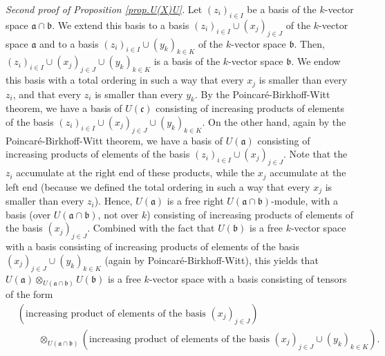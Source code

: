 \documentclass
[numbers=enddot,12pt,final,onecolumn,german,notitlepage]{scrartcl}%
\theoremstyle{definition}
\begin{document}
\textit{Second proof of Proposition \ref{prop.U(X)U}.} Let $\left(
z_{i}\right)  _{i\in I}$ be a basis of the $k$-vector space $\mathfrak{a}%
\cap\mathfrak{b}$. We extend this basis to a basis $\left(  z_{i}\right)
_{i\in I}\cup\left(  x_{j}\right)  _{j\in J}$ of the $k$-vector space
$\mathfrak{a}$ and to a basis $\left(  z_{i}\right)  _{i\in I}\cup\left(
y_{k}\right)  _{k\in K}$ of the $k$-vector space $\mathfrak{b}$. Then,
$\left(  z_{i}\right)  _{i\in I}\cup\left(  x_{j}\right)  _{j\in J}\cup\left(
y_{k}\right)  _{k\in K}$ is a basis of the $k$-vector space $\mathfrak{b}$. We
endow this basis with a total ordering in such a way that every $x_{j}$ is
smaller than every $z_{i}$, and that every $z_{i}$ is smaller than every
$y_{k}$. By the Poincar\'{e}-Birkhoff-Witt theorem, we have a basis of
$U\left(  \mathfrak{c}\right)  $ consisting of increasing products of elements
of the basis $\left(  z_{i}\right)  _{i\in I}\cup\left(  x_{j}\right)  _{j\in
J}\cup\left(  y_{k}\right)  _{k\in K}$. On the other hand, again by the
Poincar\'{e}-Birkhoff-Witt theorem, we have a basis of $U\left(
\mathfrak{a}\right)  $ consisting of increasing products of elements of the
basis $\left(  z_{i}\right)  _{i\in I}\cup\left(  x_{j}\right)  _{j\in J}$.
Note that the $z_{i}$ accumulate at the right end of these products, while the
$x_{j}$ accumulate at the left end (because we defined the total ordering in
such a way that every $x_{j}$ is smaller than every $z_{i}$). Hence, $U\left(
\mathfrak{a}\right)  $ is a free right $U\left(  \mathfrak{a}\cap
\mathfrak{b}\right)  $-module, with a basis (over $U\left(  \mathfrak{a}%
\cap\mathfrak{b}\right)  $, not over $k$) consisting of increasing products of
elements of the basis $\left(  x_{j}\right)  _{j\in J}$. Combined with the
fact that $U\left(  \mathfrak{b}\right)  $ is a free $k$-vector space with a
basis consisting of increasing products of elements of the basis $\left(
x_{j}\right)  _{j\in J}\cup\left(  y_{k}\right)  _{k\in K}$ (again by
Poincar\'{e}-Birkhoff-Witt), this yields that $U\left(  \mathfrak{a}\right)
\otimes_{U\left(  \mathfrak{a}\cap\mathfrak{b}\right)  }U\left(
\mathfrak{b}\right)  $ is a free $k$-vector space with a basis consisting of
tensors of the form%
\begin{align*}
&  \left(  \text{increasing product of elements of the basis }\left(
x_{j}\right)  _{j\in J}\right) \\
&  \ \ \ \ \ \ \ \ \ \ \otimes_{U\left(  \mathfrak{a}\cap\mathfrak{b}\right)
}\left(  \text{increasing product of elements of the basis }\left(
x_{j}\right)  _{j\in J}\cup\left(  y_{k}\right)  _{k\in K}\right)  .
\end{align*}
\end{document}
